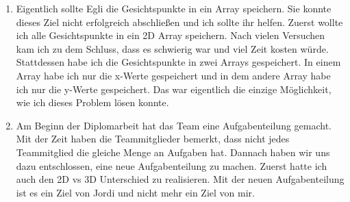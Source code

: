 \begin{itemize}
\begin{enumerate}
	\item Eigentlich sollte Egli die Gesichtspunkte in ein Array speichern. Sie konnte dieses Ziel nicht erfolgreich abschlie{\ss}en und ich sollte ihr helfen. Zuerst wollte ich alle Gesichtspunkte in ein 2D Array speichern. Nach vielen Versuchen kam ich zu dem Schluss, dass es schwierig war und viel Zeit kosten w\"urde. Stattdessen habe ich die Gesichtspunkte in zwei Arrays gespeichert. In einem Array habe ich nur die x-Werte gespeichert und in dem andere Array habe ich nur die y-Werte gespeichert. Das war eigentlich die einzige M\"oglichkeit, wie ich dieses Problem l\"osen konnte. 
	
	\item Am Beginn der Diplomarbeit hat das Team eine Aufgabenteilung gemacht. Mit der Zeit haben die Teammitglieder bemerkt, dass nicht jedes Teammitglied die gleiche Menge an Aufgaben hat. Dannach haben wir uns dazu entschlossen, eine neue Aufgabenteilung zu machen. Zuerst hatte ich auch den 2D vs 3D Unterschied zu realisieren. Mit der neuen Aufgabenteilung ist es ein Ziel von Jordi und nicht mehr ein Ziel von mir. 
\end{enumerate}
\end{itemize}
